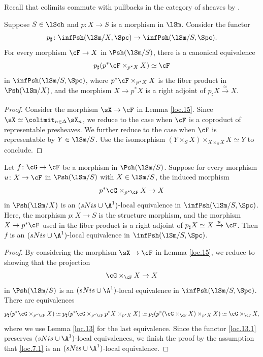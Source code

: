 \documentclass[10pt]{amsart}
\begin{document}
Recall that colimits commute with pullbacks in the category of sheaves by \cite[Proposition II.4.3(1)]{SGA4}.

\begin{lem}
\label{loc.13}
Suppose $S\in \lSch$ and $p\colon X\to S$ is a morphism in $\lSm$.
Consider the functor
\begin{equation}
\label{loc.13.1}
p_\sharp \colon \infPsh(\lSm/X,\Spc)\to \infPsh(\lSm/S,\Spc).
\end{equation}
For every morphism $\cF\to X$ in $\Psh(\lSm/S)$, there is a canonical equivalence
\[
p_\sharp (p^*\cF\times_{p^* X}X)\simeq \cF
\]
in $\infPsh(\lSm/S,\Spc)$, where $p^*\cF\times_{p^*X } X$ is the fiber product in $\Psh(\lSm/X)$, and the morphism $X\to p^*X$ is a right adjoint of $p_\sharp X\xrightarrow{\simeq} X$.
\end{lem}
\begin{proof}
Consider the morphism $\sX\to \cF$ in Lemma \ref{loc.15}.
Since $\sX\simeq \colimit_{n\in \Delta}\sX_n$, we reduce to the case when $\cF$ is a coproduct of representable presheaves.
We further reduce to the case when $\cF$ is representable by $Y\in \lSm/S$.
Use the isomorphism $(Y\times_S X)\times_{X\times_S X}X \simeq Y$ to conclude.
\end{proof}


\begin{lem}
\label{loc.7}
Let $f\colon \cG\to \cF$ be a morphism in $\Psh(\lSm/S)$.
Suppose for every morphism $u\colon X\to \cF$ in $\Psh(\lSm/S)$ with $X\in \lSm/S$, the induced morphism
\begin{equation}
\label{loc.7.1}
p^*\cG\times_{p^*\cF}X
\to
X
\end{equation}
in $\Psh(\lSm/X)$ is an $(sNis\cup\A^1)$-local equivalence in $\infPsh(\lSm/S,\Spc)$.
Here, the morphism $p\colon X\to S$ is the structure morphism, and the morphism $X\to p^*\cF$ used in the fiber product is a right adjoint of $p_\sharp X\simeq X\xrightarrow{u}\cF$.
Then $f$ is an $(sNis\cup \A^1)$-local equivalence in $\infPsh(\lSm/S,\Spc)$.
\end{lem}
\begin{proof}
By considering the morphism $\sX\to \cF$ in Lemma \ref{loc.15}, we reduce to showing that the projection
\[
\cG\times_{\cF}X\to X
\]
in $\Psh(\lSm/S)$ is an $(sNis\cup \A^1)$-local equivalence in $\infPsh(\lSm/S,\Spc)$.
There are equivalences
\[
p_\sharp(p^*\cG\times_{p^*\cF}X)
\simeq
p_\sharp(p^*\cG\times_{p^*\cF}p^*X\times_{p^*X}X)
\simeq
p_\sharp(p^*(\cG\times_{\cF}X)\times_{p^*X}X)
\simeq
\cG\times_{\cF}X,
\]
where we use Lemma \ref{loc.13} for the last equivalence.
Since the functor \eqref{loc.13.1} preserves $(sNis\cup \A^1)$-local equivalences, we finish the proof by the assumption that \eqref{loc.7.1} is an $(sNis\cup \A^1)$-local equivalence.
\end{proof}
\end{document}
